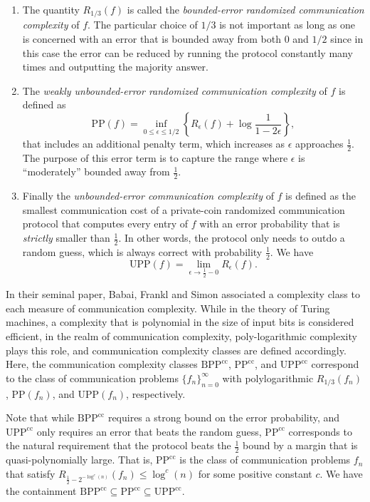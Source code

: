 \documentclass{toc}
\newcommand{\BPP}{\mathrm{BPP}}
\newcommand{\UPP}{\mathrm{UPP}}
\newcommand{\calPP}{\mathrm{PP}}
\newcommand{\cc}{\mathrm{cc}}
\begin{document}
\begin{enumerate}
\item The quantity $R_{1/3}(f)$ is called the \emph{bounded-error  randomized communication complexity} of $f$.  The particular choice of $1/3$  is not important as long as one is concerned with an error that is bounded away from both $0$ and $1/2$ since in this case the error  can be reduced   by running the protocol constantly many times and outputting the majority answer.

\item The \emph{weakly unbounded-error  randomized communication complexity} of $f$ is defined as
$$\calPP(f) =  \inf_{0 \le \epsilon \le 1/2} \left\{R_\epsilon(f) +  \log  \frac{1}{1-2 \epsilon}  \right\}, $$
that includes an additional penalty term, which increases as $\epsilon$ approaches $\frac{1}{2}$. The purpose of this error term is to capture the range where $\epsilon$ is ``moderately'' bounded away from $\frac{1}{2}$.

\item Finally the \emph{unbounded-error communication complexity} of $f$ is defined as the smallest communication cost of a  private-coin randomized communication protocol that   computes every entry of $f$   with an error probability that is \emph{strictly} smaller than $\frac{1}{2}$. In other words,   the protocol only needs to  outdo a random guess, which is always correct with  probability $\frac{1}{2}$. We have
%
%
%
$$\UPP(f)=\lim_{\epsilon \to \frac{1}{2}-0} R_\epsilon(f).$$
%
\end{enumerate}

In their seminal paper, Babai, Frankl and Simon \cite{babai1986complexity} associated a   complexity class to each measure of communication complexity. While in the theory of Turing machines, a  complexity that is polynomial in the size of input bits is considered efficient, in the realm of communication complexity, poly-logarithmic complexity plays this role, and communication complexity classes are defined accordingly.  Here, the communication complexity classes $\BPP^\cc$, $\calPP^\cc$, and  $\UPP^\cc$  correspond to the class of communication problems $\{f_n\}_{n=0}^\infty$ with  polylogarithmic  $R_{1/3}(f_n)$, $\calPP(f_n)$, and $\UPP(f_n)$, respectively.

Note that while $\BPP^\cc$ requires a strong bound on the error probability, and $\UPP^\cc$ only requires an error that beats  the random guess, $\calPP^\cc$  corresponds to the natural requirement that the  protocol  beats the $\frac{1}{2}$ bound by a margin that is quasi-polynomially large.  That is, $\calPP^\cc$  is  the class of communication problems $f_n$ that satisfy $R_{\frac{1}{2}-2^{-\log^c(n)}}(f_n) \le \log^c(n)$ for some positive constant $c$.  We have the containment $\BPP^\cc \subseteq \calPP^\cc \subseteq \UPP^\cc$.
\end{document}
